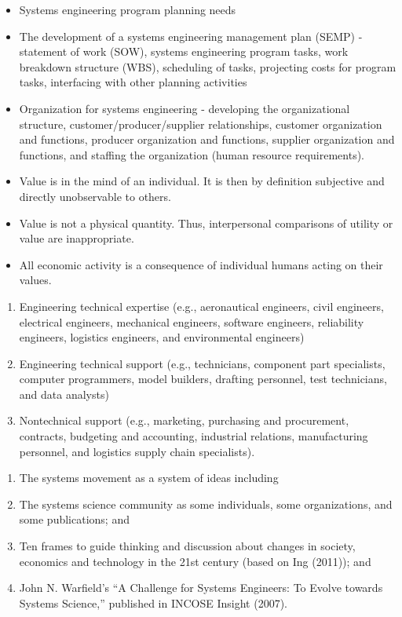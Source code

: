 \begin{itemize}
	\item Systems engineering program planning needs
	\item The development of a systems engineering management plan (SEMP) - statement of work (SOW), systems engineering program tasks, work breakdown structure (WBS), scheduling of tasks, projecting costs for program tasks, interfacing with other planning activities
	\item Organization for systems engineering - developing the organizational structure, customer/producer/supplier relationships, customer organization and functions, producer organization and functions, supplier organization and functions, and staffing the organization (human resource requirements).
\end{itemize}

\begin{itemize}
	\item Value is in the mind of an individual. It is then by definition subjective and directly unobservable to others.
	\item Value is not a physical quantity. Thus, interpersonal comparisons of utility or value are inappropriate.
	\item All economic activity is a consequence of individual humans acting on their values.
\end{itemize}

\begin{enumerate}
	\item Engineering technical expertise (e.g., aeronautical engineers, civil engineers, electrical engineers, mechanical engineers, software engineers, reliability engineers, logistics engineers, and environmental engineers)
	\item Engineering technical support (e.g., technicians, component part specialists, computer programmers, model builders, drafting personnel, test technicians, and data analysts)
	\item Nontechnical support (e.g., marketing, purchasing and procurement, contracts, budgeting and accounting, industrial relations, manufacturing personnel, and logistics supply chain specialists). 
\end{enumerate}

\begin{enumerate}
	\item The systems movement as a system of ideas including
	\item The systems science community as some individuals, some organizations, and some publications; and
	\item Ten frames to guide thinking and discussion about changes in society, economics and technology in the 21st century (based on Ing (2011)); and
	\item John N. Warfield’s ``A Challenge for Systems Engineers: To Evolve towards Systems Science,'' published in INCOSE Insight (2007).
\end{enumerate}

